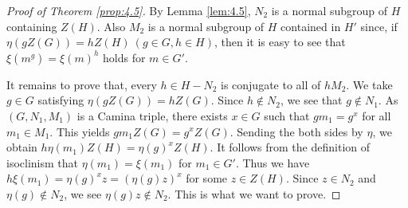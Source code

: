 \documentclass[10pt,a4paper]{amsart}
\begin{document}
\begin{proof}[Proof of Theorem \ref{prop:4.5}]
    By Lemma \ref{lem:4.5}, $N_2$ is a normal subgroup of $H$ containing $Z (H)$. Also 
    $M_2$ is a normal subgroup of $H$ contained in $H'$ since,
     if $\eta (gZ (G)) = h Z(H) \ (g \in G, h \in H)$, then it is easy to see that
    $\xi (m^g) = \xi (m)^h $ holds for $m \in G'$.

    It remains to prove that, every $h \in H-N_2$ is conjugate to all of $hM_2$.
    We take $g \in G$ satisfying $\eta (g Z(G)) = h Z(G)$. Since $h \not\in N_2$,
    we see that $g \not\in N_1$. As $(G,N_1,M_1)$ is a Camina triple, there exists $x \in G$
    such that $g m_1  = g^x $ for all $m_1 \in M_1$.
This yields $g m_1 Z(G) = g^x Z(G)$. Sending the both sides by $\eta$, we obtain 
$h \eta (m_1) Z (H) = \eta (g)^x Z (H)$. It follows from the definition of 
isoclinism that $\eta (m_1) = \xi (m_1) $ for $m_1 \in G'$. Thus we have
$h \xi (m_1) = \eta (g)^x z = (\eta (g) z)^x$  for some $z \in Z(H)$.
Since $z \in N_2$ and $\eta (g) \not\in N_2$, we see $\eta (g) z \not\in N_2$.
This is what we want to prove.
\end{proof}
\end{document}
